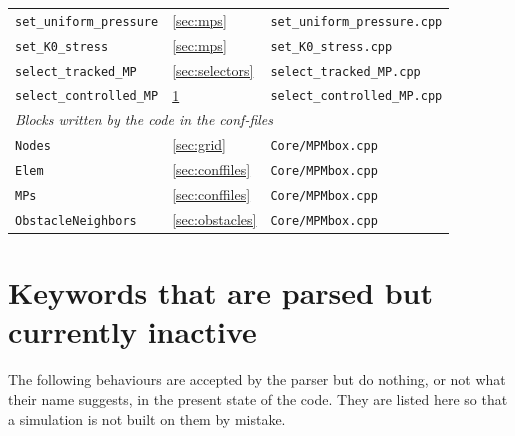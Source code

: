 \documentclass[a4paper,onecolumn,11pt]{doofus}
\begin{document}
\begin{center}
\begin{longtable}{lll}
\texttt{set\_uniform\_pressure} & \ref{sec:mps} & \texttt{set\_uniform\_pressure.cpp} \\
\texttt{set\_K0\_stress}       & \ref{sec:mps}  & \texttt{set\_K0\_stress.cpp} \\
\texttt{select\_tracked\_MP}   & \ref{sec:selectors} & \texttt{select\_tracked\_MP.cpp} \\
\texttt{select\_controlled\_MP} & \ref{sec:inactive} & \texttt{select\_controlled\_MP.cpp} \\
\midrule
\multicolumn{3}{l}{\emph{Blocks written by the code in the conf-files}}\\
\midrule
\texttt{Nodes}             & \ref{sec:grid}      & \texttt{Core/MPMbox.cpp} \\
\texttt{Elem}              & \ref{sec:conffiles} & \texttt{Core/MPMbox.cpp} \\
\texttt{MPs}               & \ref{sec:conffiles} & \texttt{Core/MPMbox.cpp} \\
\texttt{ObstacleNeighbors} & \ref{sec:obstacles} & \texttt{Core/MPMbox.cpp} \\
\end{longtable}
\end{center}


\section{Keywords that are parsed but currently inactive}
\label{sec:inactive}

The following behaviours are accepted by the parser but do nothing, or not what their name
suggests, in the present state of the code. They are listed here so that a simulation is not
built on them by mistake.
\end{document}
